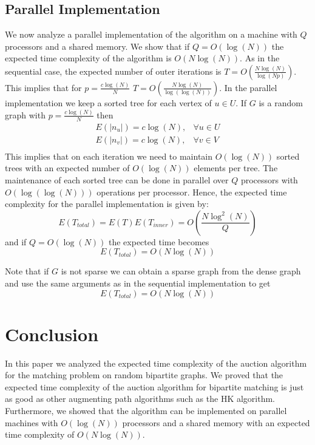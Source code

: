 \documentclass[11pt,onecolumn]{article}
\newcommand{\beq}{\begin{equation}}
\newcommand{\eeq}{\end{equation}}
\newcommand{\bea}{\begin{array}}
\newcommand{\ena}{\end{array}}
\begin{document}
\subsection{Parallel Implementation}
We now analyze a parallel implementation of the algorithm on a machine with $Q$ processors and a shared memory. We show that if $Q=O\left(\log(N)\right)$ the expected time complexity of the algorithm is $O\left(N\log(N)\right)$. As in the sequential case, the expected number of outer iterations is $T=O\left(\frac{N\log(N)}{\log(Np)}\right)$. This implies that for $p=\frac{c\log(N)}{N}$ $T=O\left(\frac{N\log(N)}{\log(\log(N))}\right)$. In the parallel implementation we keep a sorted tree for each vertex of $u\in U$. If $G$ is a random graph with $p=\frac{c\log(N)}{N}$ then
\beq
\bea{ll}
E(|n_u|)=c\log(N), & \forall u\in U\\
E(|n_v|)=c\log(N), & \forall v\in V\\
\ena
\eeq
This implies that on each iteration we need to maintain $O\left(\log(N)\right)$ sorted trees with an expected number of $O\left(\log(N)\right)$ elements per tree. The maintenance of each sorted tree can be done in parallel over $Q$ processors with $O\left(\log\left(\log(N)\right)\right)$ operations per processor. Hence, the expected time complexity for the parallel implementation is given by:
\beq
E(T_{total})=E(T)E(T_{inner})=O\left(\frac{N\log^2(N)}{Q}\right)
\eeq
and if $Q=O(\log(N))$ the expected time becomes
\beq
E(T_{total})=O\left(N\log(N)\right)
\eeq

Note that if $G$ is not sparse we can obtain a sparse graph from the dense graph and use the same arguments as in the sequential implementation to get
\beq
E(T_{total})=O\left(N\log(N)\right)
\eeq

\section {Conclusion}
In this paper we analyzed the expected time complexity of the auction algorithm for the matching problem on random bipartite graphs. We proved that the expected time complexity of the auction algorithm for bipartite matching is just as good as other augmenting path algorithms such  as the HK algorithm. Furthermore, we showed that the algorithm can be implemented on parallel machines with $O(\log(N))$ processors and a shared memory with an expected time complexity of $O(N\log(N))$.
\end{document}
